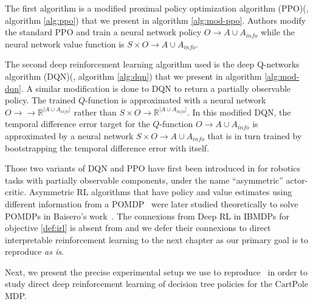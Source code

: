 The first algorithm is a modified proximal policy optimization algorithm (PPO)(\cite{ppo}, algorithm \ref{alg:ppo}) that we present in algorithm \ref{alg:mod-ppo}.
Authors modify the standard PPO and train a neural network policy $O\rightarrow A\cup A_{info}$ while the neural network value function is $S\times O\rightarrow A\cup A_{info}$.

The second deep reinforcement learning algorithm used is the deep Q-networks algorithm (DQN)(\cite{dqn}, algorithm \ref{alg:dqn}) that we present in algorithm \ref{alg:mod-dqn}.
A similar modification is done to DQN to return a partially observable policy. The trained $Q$-function is approximated with a neural network $O\rightarrow \rightarrow \mathbb{R}^{|A\cup A_{info}|}$ rather than $S\times O\rightarrow \mathbb{R}^{|A\cup A_{info}|}$.
In this modified DQN, the temporal difference error target for the $Q$-function $O\rightarrow A\cup A_{info}$ is approximated by a neural network $S\times O\rightarrow A\cup A_{info}$ that is in turn trained by bootstrapping the temporal difference error with itself.

Those two variants of DQN and PPO have first been introduced in \cite{pinto} for robotics tasks with partially observable components, under the name ``asymmetric'' actor-critic. 
Asymmetric RL algorithms that have policy and value estimates using different information from a POMDP~\cite{POMDP,chap2} were later studied theoretically to solve POMDPs in Baisero's work~\cite{baisero-dqn,baisero-ppo}.
The connexions from Deep RL in IBMDPs for objective \ref{def:irl} is absent from \cite{topin2021iterative} and we defer their connexions to direct interpretable reinforcement learning to the next chapter as our primary goal is to reproduce \cite{topin2021iterative} \textit{as is}.

Next, we present the precise experimental setup we use to reproduce~\cite[Table 1]{topin2021iterative} in order to study direct deep reinforcement learning of decision tree policies for the CartPole MDP.

